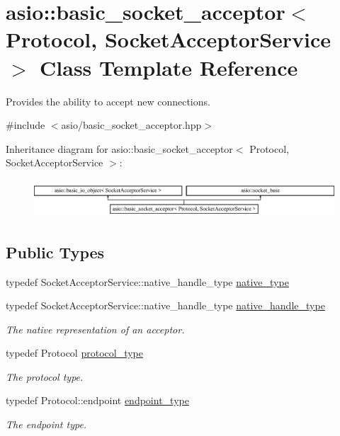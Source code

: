 \hypertarget{classasio_1_1basic__socket__acceptor}{}\section{asio\+:\+:basic\+\_\+socket\+\_\+acceptor$<$ Protocol, Socket\+Acceptor\+Service $>$ Class Template Reference}
\label{classasio_1_1basic__socket__acceptor}


Provides the ability to accept new connections.  




{\ttfamily \#include $<$asio/basic\+\_\+socket\+\_\+acceptor.\+hpp$>$}

Inheritance diagram for asio\+:\+:basic\+\_\+socket\+\_\+acceptor$<$ Protocol, Socket\+Acceptor\+Service $>$\+:\begin{figure}[H]
\begin{center}
\leavevmode
\includegraphics[height=1.424936cm]{classasio_1_1basic__socket__acceptor}
\end{center}
\end{figure}
\subsection*{Public Types}
\begin{DoxyCompactItemize}
\item 
typedef Socket\+Acceptor\+Service\+::native\+\_\+handle\+\_\+type \hyperlink{classasio_1_1basic__socket__acceptor_a816fd87f40cd81374fa6b0c66e11006c}{native\+\_\+type}
\item 
typedef Socket\+Acceptor\+Service\+::native\+\_\+handle\+\_\+type \hyperlink{classasio_1_1basic__socket__acceptor_a6b3afaaad5c55272803ad5b911a00d35}{native\+\_\+handle\+\_\+type}
\begin{DoxyCompactList}\small\item\em The native representation of an acceptor. \end{DoxyCompactList}\item 
typedef Protocol \hyperlink{classasio_1_1basic__socket__acceptor_a38f40022b2596eb88875792bd6c0fb21}{protocol\+\_\+type}
\begin{DoxyCompactList}\small\item\em The protocol type. \end{DoxyCompactList}\item 
typedef Protocol\+::endpoint \hyperlink{classasio_1_1basic__socket__acceptor_a393d69e2f8a370aaa13a9018af4c0048}{endpoint\+\_\+type}
\begin{DoxyCompactList}\small\item\em The endpoint type. \end{DoxyCompactList}\end{DoxyCompactItemize}
